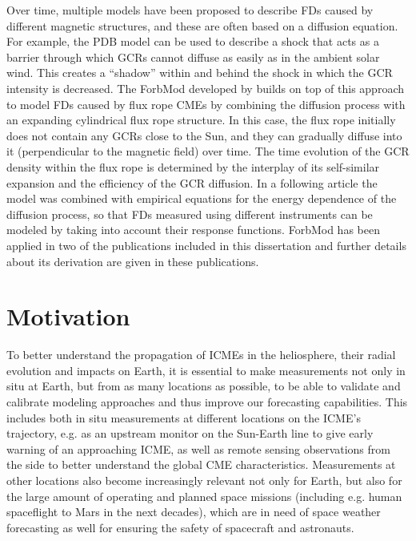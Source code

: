 Over time, multiple models have been proposed to describe \acp{FD} caused by different magnetic structures, and these are often based on a diffusion equation. For example, the \acl{PDB} model \citep[\acs{PDB},][]{Wibberenz-1998} can be used to describe a shock that acts as a barrier through which \acp{GCR} cannot diffuse as easily as in the ambient solar wind. This creates a ``shadow'' within and behind the shock in which the \ac{GCR} intensity is decreased.
The \ac{ForbMod} developed by \citet{Dumbovic2018-ForbMod} builds on top of this approach to model \acp{FD} caused by flux rope \acp{CME} by combining the diffusion process with an expanding cylindrical flux rope structure. In this case, the flux rope initially does not contain any \acp{GCR} close to the Sun, and they can gradually diffuse into it (perpendicular to the magnetic field) over time. The time evolution of the \ac{GCR} density within the flux rope is determined by the interplay of its self-similar expansion and the efficiency of the \ac{GCR} diffusion. In a following article \citep{Dumbovic-2020-ForbMod} the model was combined with empirical equations for the energy dependence of the diffusion process, so that \acp{FD} measured using different instruments can be modeled by taking into account their response functions. \ac{ForbMod} has been applied in two of the publications included in this dissertation \citep{Forstner-2020,Forstner-2021-SolO} and further details about its derivation are given in these publications.

\section{Motivation}
\label{sec:motivation}

To better understand the propagation of \acp{ICME} in the heliosphere, their radial evolution and impacts on Earth, it is essential to make measurements not only in situ at Earth, but from as many locations as possible, to be able to validate and calibrate modeling approaches and thus improve our forecasting capabilities. This includes both in situ measurements at different locations on the \ac{ICME}'s trajectory, e.g. as an upstream monitor on the Sun-Earth line to give early warning of an approaching \ac{ICME}, as well as remote sensing observations from the side to better understand the global \ac{CME} characteristics. Measurements at other locations also become increasingly relevant not only for Earth, but also for the large amount of operating and planned space missions (including e.g. human spaceflight to Mars in the next decades), which are in need of space weather forecasting as well for ensuring the safety of spacecraft and astronauts.

